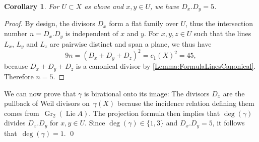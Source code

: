 \documentclass[a4paper]{amsart}
\DeclareMathOperator{\Gr}{Gr}
\DeclareMathOperator{\Lie}{Lie}
\theoremstyle{plain}
\newtheorem{corollary}[theorem]{Corollary}
\theoremstyle{definition}
\numberwithin{equation}{section}
\begin{document}
\begin{corollary} For $U\subset X$ as above and $x, y \in U$, we have $D_x . D_y = 5$.
\end{corollary}

\begin{proof} By design, the divisors $D_x$ form a flat family over $U$, thus the intersection number $n=D_x.D_y$ is independent of $x$ and $y$. For $x, y, z \in U$ such that the lines $L_x$, $L_y$ and $L_z$ are pairwise distinct and span a plane, we thus have
\[ 9n = (D_x + D_y + D_z)^2 = c_1(X)^2 = 45,\]
because $D_x + D_y + D_z$ is a canonical divisor by \cref{Lemma:FormulaLinesCanonical}. Therefore $n = 5$.
\end{proof}

We can now prove that $\gamma$ is birational onto its image: The divisors $D_x$ are the pullback of Weil divisors on~$\gamma(X)$ because the incidence relation defining them comes from~$\Gr_2(\Lie A)$. The projection formula then implies that $\deg(\gamma)$ divides $D_x . D_y$ for $x, y \in U$. Since $\deg(\gamma)\in \{1,3\}$ and $D_x . D_y = 5$, it follows that~$\deg(\gamma)=1$. \qed
\end{document}
